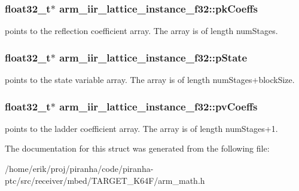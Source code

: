 \subsubsection[{\texorpdfstring{pk\+Coeffs}{pkCoeffs}}]{\setlength{\rightskip}{0pt plus 5cm}float32\+\_\+t$\ast$ arm\+\_\+iir\+\_\+lattice\+\_\+instance\+\_\+f32\+::pk\+Coeffs}\hypertarget{structarm__iir__lattice__instance__f32_aa69fcdd3775e828d450ce1bbd978fa31}{}\label{structarm__iir__lattice__instance__f32_aa69fcdd3775e828d450ce1bbd978fa31}
points to the reflection coefficient array. The array is of length num\+Stages. 
\subsubsection[{\texorpdfstring{p\+State}{pState}}]{\setlength{\rightskip}{0pt plus 5cm}float32\+\_\+t$\ast$ arm\+\_\+iir\+\_\+lattice\+\_\+instance\+\_\+f32\+::p\+State}\hypertarget{structarm__iir__lattice__instance__f32_a30babe7815510219e6e3d28e6e4a5969}{}\label{structarm__iir__lattice__instance__f32_a30babe7815510219e6e3d28e6e4a5969}
points to the state variable array. The array is of length num\+Stages+block\+Size. 
\subsubsection[{\texorpdfstring{pv\+Coeffs}{pvCoeffs}}]{\setlength{\rightskip}{0pt plus 5cm}float32\+\_\+t$\ast$ arm\+\_\+iir\+\_\+lattice\+\_\+instance\+\_\+f32\+::pv\+Coeffs}\hypertarget{structarm__iir__lattice__instance__f32_afc7c8f577e6f27d097fe55f57e707f72}{}\label{structarm__iir__lattice__instance__f32_afc7c8f577e6f27d097fe55f57e707f72}
points to the ladder coefficient array. The array is of length num\+Stages+1. 

The documentation for this struct was generated from the following file\+:\begin{DoxyCompactItemize}
\item 
/home/erik/proj/piranha/code/piranha-\/ptc/src/receiver/mbed/\+T\+A\+R\+G\+E\+T\+\_\+\+K64\+F/arm\+\_\+math.\+h\end{DoxyCompactItemize}
